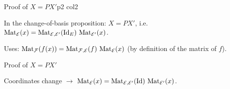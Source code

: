 \documentclass[course,noautoquant,noautokw]{neyvia-study}
\begin{document}
\begin{concept}[1.56]{Proof of $X=PX'$}{p2 col2}
\begin{definition}
\noindent In the change-of-basis proposition: $X=PX'$, i.e. $\operatorname{Mat}_{\mathcal E}(x)=\operatorname{Mat}_{\mathcal E,\mathcal E'}(\mathrm{Id}_E)\,\operatorname{Mat}_{\mathcal E'}(x)$.
\par\noindent Uses: $\operatorname{Mat}_{\mathcal F}(f(x))=\operatorname{Mat}_{\mathcal F,\mathcal E}(f)\,\operatorname{Mat}_{\mathcal E}(x)$ (by definition of the matrix of $f$).
\end{definition}
\begin{method}{Proof of $X=PX'$}
\end{method}
\begin{reflex}
Coordinates change \ensuremath{\rightarrow} $\operatorname{Mat}_{\mathcal E}(x)=\operatorname{Mat}_{\mathcal E,\mathcal E'}(\mathrm{Id})\,\operatorname{Mat}_{\mathcal E'}(x)$.
\end{reflex}
\begin{traps}
\end{traps}
\end{concept}
\end{document}
